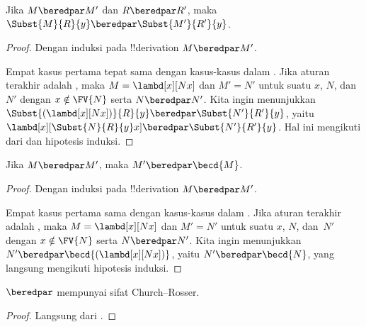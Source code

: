 \documentclass[../../../include/open-logic-section]{subfiles}
\begin{document}
\begin{lem}
  Jika $M\beredpar M'$ dan $R\beredpar R'$, maka $\Subst{M}{R}{y}
  \beredpar\Subst{M'}{R'}{y}$.
\end{lem}

\begin{proof}
  Dengan induksi pada !!{derivation} $M\beredpar M'$.

  Empat kasus pertama tepat sama dengan kasus-kasus dalam
  . Jika aturan terakhir adalah
  , maka $M=\lambd[x][Nx]$ dan $M'=N'$ untuk suatu
  $x$, $N$, dan~$N'$ dengan $x\notin\FV{N}$ serta $N\beredpar N'$. Kita ingin
  menunjukkan
  $\Subst{(\lambd[x][Nx])}{R}{y}\beredpar\Subst{N'}{R'}{y}$, yaitu
  $\lambd[x][\Subst{N}{R}{y}x]\beredpar\Subst{N'}{R'}{y}$. Hal ini mengikuti
  dari  dan hipotesis induksi.
\end{proof}

\begin{lem}
  Jika $M\beredpar M'$, maka $M'\beredpar\becd{M}$.
\end{lem}

\begin{proof}
  Dengan induksi pada !!{derivation} $M\beredpar M'$.

  Empat kasus pertama sama dengan kasus-kasus dalam . Jika
  aturan terakhir adalah , maka
  $M=\lambd[x][Nx]$ dan $M'=N'$ untuk suatu $x$, $N$, dan~$N'$ dengan
  $x\notin\FV{N}$ serta $N\beredpar N'$. Kita ingin menunjukkan
  $N'\beredpar\becd{(\lambd[x][Nx])}$, yaitu $N'\beredpar\becd{N}$, yang
  langsung mengikuti hipotesis induksi.
\end{proof}

\begin{thm}
  $\beredpar$ mempunyai sifat Church--Rosser.
\end{thm}

\begin{proof}
  Langsung dari .
\end{proof}
\end{document}
